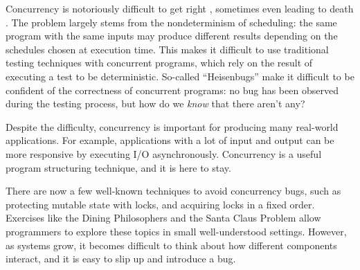 Concurrency is notoriously difficult to get right \citep{overrated},
sometimes even leading to death \citep{therac25}. The problem largely
stems from the nondeterminism of scheduling: the same program with the
same inputs may produce different results depending on the schedules
chosen at execution time. This makes it difficult to use traditional
testing techniques with concurrent programs, which rely on the result
of executing a test to be deterministic. So-called ``Heisenbugs'' make
it difficult to be confident of the correctness of concurrent
programs: no bug has been observed during the testing process, but how
do we \emph{know} that there aren't any?

Despite the difficulty, concurrency is important for producing many
real-world applications. For example, applications with a lot of input
and output can be more responsive by executing I/O asynchronously.
Concurrency is a useful program structuring technique, and it is here
to stay.

There are now a few well-known techniques to avoid concurrency bugs,
such as protecting mutable state with locks, and acquiring locks in a
fixed order. Exercises like the Dining Philosophers
\citep{diningphilosophers} and the Santa Claus Problem
\citep{santaclaus} allow programmers to explore these topics in small
well-understood settings. However, as systems grow, it becomes
difficult to think about how different components interact, and it is
easy to slip up and introduce a bug.
